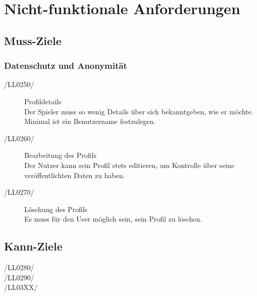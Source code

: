 \documentclass[11pt,a4paper]{scrreprt}
\begin{document}
\chapter{Nicht-funktionale Anforderungen}
\section{Muss-Ziele}
\subsection{Datenschutz und Anonymität}
\begin{description}
\item[/LL0250/] Profildetails \\
Der Spieler muss so wenig Details über sich bekanntgeben, wie er möchte. Minimal ist ein Benutzername festzulegen.
\item[/LL0260/] Bearbeitung des Profils \\ 
Der Nutzer kann sein Profil stets editieren, um Kontrolle über seine veröffentlichten Daten zu haben.
\item[/LL0270/] Löschung des Profils \\ 
Es muss für den User möglich sein, sein Profil zu löschen.
\end{description}
\section{Kann-Ziele}
\begin{description}
\item[/LL0280/]
\item[/LL0290/]
\item[/LL03XX/]
\end{description}
\end{document}
